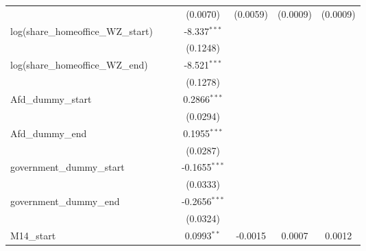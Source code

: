 \documentclass[10pt,a4paper]{article}
\begin{document}
\begin{tabular}{lcccccc}
                                                    &                &                & (0.0070)        & (0.0059)       & (0.0009)        & (0.0009)\\   
   log(share\_homeoffice\_WZ\_start)                &                &                & -8.337$^{***}$  &                &                 &   \\   
                                                    &                &                & (0.1248)        &                &                 &   \\   
   log(share\_homeoffice\_WZ\_end)                  &                &                & -8.521$^{***}$  &                &                 &   \\   
                                                    &                &                & (0.1278)        &                &                 &   \\   
   Afd\_dummy\_start                                &                &                & 0.2866$^{***}$  &                &                 &   \\   
                                                    &                &                & (0.0294)        &                &                 &   \\   
   Afd\_dummy\_end                                  &                &                & 0.1955$^{***}$  &                &                 &   \\   
                                                    &                &                & (0.0287)        &                &                 &   \\ 
   government\_dummy\_start                         &                &                & -0.1655$^{***}$ &                &                 &   \\   
                                                    &                &                & (0.0333)        &                &                 &   \\   
   government\_dummy\_end                           &                &                & -0.2656$^{***}$ &                &                 &   \\   
                                                    &                &                & (0.0324)        &                &                 &   \\   
   \midrule
   M14\_start                                       &                &                & 0.0993$^{**}$   & -0.0015        & 0.0007          & 0.0012\\   

\end{tabular}
\end{document}
